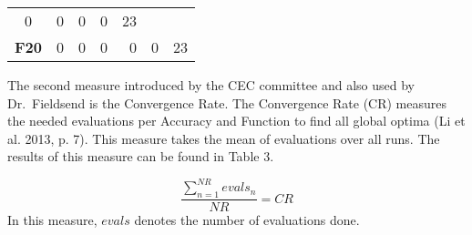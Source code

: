 \documentclass[12pt,a4paper]{article}
\begin{document}
\begin{longtable}[c]{@{}crrrrrr@{}}
\begin{minipage}[t]{0.08\columnwidth}
0
\strut\end{minipage} &
\begin{minipage}[t]{0.09\columnwidth}\raggedleft\strut
0
\strut\end{minipage} &
\begin{minipage}[t]{0.10\columnwidth}\raggedleft\strut
0
\strut\end{minipage} &
\begin{minipage}[t]{0.11\columnwidth}\raggedleft\strut
0
\strut\end{minipage} &
\begin{minipage}[t]{0.07\columnwidth}\raggedleft\strut
23
\strut\end{minipage}\tabularnewline
\begin{minipage}[t]{0.11\columnwidth}\centering\strut
\textbf{F20}
\strut\end{minipage} &
\begin{minipage}[t]{0.07\columnwidth}\raggedleft\strut
0
\strut\end{minipage} &
\begin{minipage}[t]{0.08\columnwidth}\raggedleft\strut
0
\strut\end{minipage} &
\begin{minipage}[t]{0.09\columnwidth}\raggedleft\strut
0
\strut\end{minipage} &
\begin{minipage}[t]{0.10\columnwidth}\raggedleft\strut
0
\strut\end{minipage} &
\begin{minipage}[t]{0.11\columnwidth}\raggedleft\strut
0
\strut\end{minipage} &
\begin{minipage}[t]{0.07\columnwidth}\raggedleft\strut
23
\strut\end{minipage}\tabularnewline
\bottomrule
\end{longtable}

The second measure introduced by the CEC committee and also used by
Dr.~Fieldsend is the Convergence Rate. The Convergence Rate (CR)
measures the needed evaluations per Accuracy and Function to find all
global optima (Li et al. 2013, p. 7). This measure takes the mean of
evaluations over all runs. The results of this measure can be found in
Table 3.

\[\frac{\sum\nolimits_{n=1}^{NR} evals_{n}}{NR} = CR\] In this measure,
\(evals\) denotes the number of evaluations done. \newline
\end{document}
